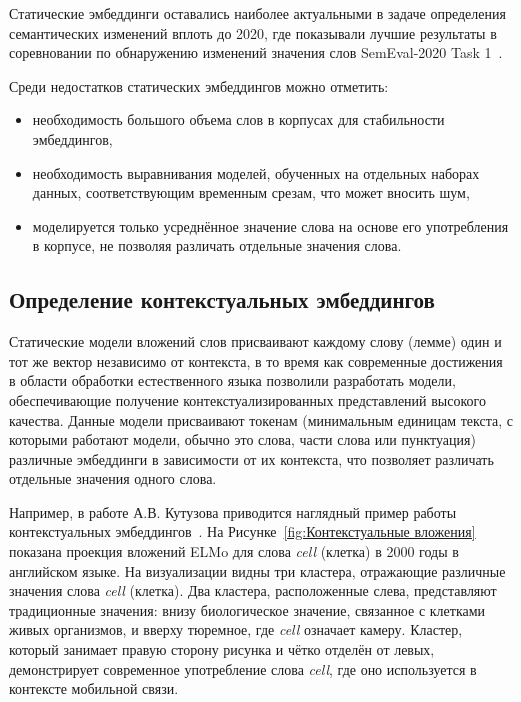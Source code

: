 \documentclass[LI,VKR]{HSEUniversity}
\begin{document}
Статические эмбеддинги оставались наиболее актуальными в задаче определения семантических изменений вплоть до 2020,
где показывали лучшие результаты в соревновании по обнаружению изменений значения слов SemEval-2020 Task 1~\cite{semeval2020task}.

Среди недостатков статических эмбеддингов можно отметить:
\begin{itemize}
    \item необходимость большого объема слов в корпусах для стабильности эмбеддингов,
    \item необходимость выравнивания моделей, обученных на отдельных наборах данных,
соответствующим временным срезам, что может вносить шум,
    \item моделируется только усреднённое значение слова на основе его употребления в корпусе,
не позволяя различать отдельные значения слова.
\end{itemize}

\subsection{Определение контекстуальных эмбеддингов}

Статические модели вложений слов присваивают каждому слову (лемме) один и тот же вектор
независимо от контекста, в то время как современные достижения в области обработки
естественного языка позволили разработать модели,
обеспечивающие получение контекстуализированных представлений высокого качества.
Данные модели присваивают токенам (минимальным единицам текста, с которыми работают модели,
обычно это слова, части слова или пунктуация) различные эмбеддинги
в зависимости от их контекста, что позволяет различать отдельные значения одного слова.

Например, в работе А.В. Кутузова приводится наглядный пример работы
контекстуальных эмбеддингов~\cite{Kutuzov2020Thesis}.
На Рисунке~\ref{fig:Контекстуальные вложения} показана проекция вложений ELMo для слова \textit{cell} (клетка)
в 2000 годы в английском языке.
На визуализации видны три кластера, отражающие различные значения слова \textit{cell} (клетка).
Два кластера, расположенные слева, представляют традиционные значения:
внизу биологическое значение, связанное с клетками живых организмов,
и вверху тюремное, где \textit{cell} означает камеру.
Кластер, который занимает правую сторону рисунка и чётко отделён от левых,
демонстрирует современное употребление слова \textit{cell},
где оно используется в контексте мобильной связи.
\end{document}
